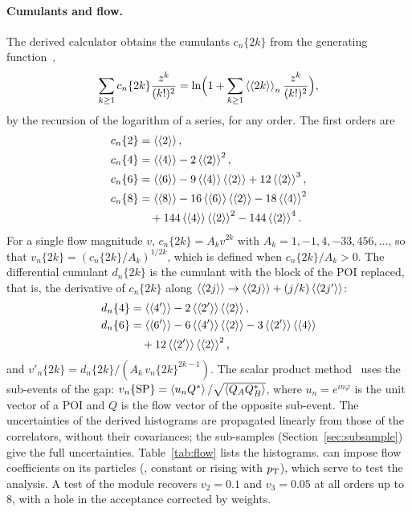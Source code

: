 \paragraph{Cumulants and flow.}
The derived calculator obtains the cumulants $c_n\{2k\}$ from the generating function~\cite{Borghini:2001vi},
\begin{equation}
  \sum_{k\ge1} c_n\{2k\}\frac{z^k}{(k!)^2} = \ln\Bigl(1+\sum_{k\ge1}\avg{\avg{2k}}_n\frac{z^k}{(k!)^2}\Bigr),
\end{equation}
by the recursion of the logarithm of a series, for any order. The first orders are
\begin{align}
  c_n\{2\} &= \avg{\avg{2}}, \nonumber\\
  c_n\{4\} &= \avg{\avg{4}} - 2\avg{\avg{2}}^2, \nonumber\\
  c_n\{6\} &= \avg{\avg{6}} - 9\avg{\avg{4}}\avg{\avg{2}} + 12\avg{\avg{2}}^3, \\
  c_n\{8\} &= \avg{\avg{8}} - 16\avg{\avg{6}}\avg{\avg{2}} - 18\avg{\avg{4}}^2 \nonumber\\
           &\quad + 144\avg{\avg{4}}\avg{\avg{2}}^2 - 144\avg{\avg{2}}^4. \nonumber
\end{align}
For a single flow magnitude $v$, $c_n\{2k\} = A_k v^{2k}$ with $A_k = 1, -1, 4, -33, 456, \dots$, so that
$v_n\{2k\} = (c_n\{2k\}/A_k)^{1/2k}$, which is defined when $c_n\{2k\}/A_k > 0$. The differential cumulant $d_n\{2k\}$ is
the cumulant with the block of the POI replaced, that is, the derivative of $c_n\{2k\}$ along
$\avg{\avg{2j}}\to\avg{\avg{2j}}+(j/k)\avg{\avg{2j'}}$:
\begin{align}
  d_n\{4\} &= \avg{\avg{4'}} - 2\avg{\avg{2'}}\avg{\avg{2}}, \nonumber\\
  d_n\{6\} &= \avg{\avg{6'}} - 6\avg{\avg{4'}}\avg{\avg{2}} - 3\avg{\avg{2'}}\avg{\avg{4}} \\
           &\quad + 12\avg{\avg{2'}}\avg{\avg{2}}^2, \nonumber
\end{align}
and $v'_n\{2k\} = d_n\{2k\}/(A_k\, v_n\{2k\}^{2k-1})$. The scalar product method~\cite{Adler:2002pu} uses the sub-events
of the gap: $v_n\{\mathrm{SP}\} = \avg{u_n Q^*}/\sqrt{\avg{Q_A Q_B^*}}$, where $u_n = e^{in\varphi}$ is the unit vector of
a POI and $Q$ is the flow vector of the opposite sub-event. The uncertainties of the derived histograms are propagated
linearly from those of the correlators, without their covariances; the sub-samples (Section~\ref{sec:subsample}) give
the full uncertainties. Table~\ref{tab:flow} lists the histograms.  can impose flow coefficients on
its particles (, constant or rising with $\pT$), which serve to test the analysis. A test of the module
recovers $v_2 = 0.1$ and $v_3 = 0.05$ at all orders up to 8, with a hole in the acceptance corrected by weights.


